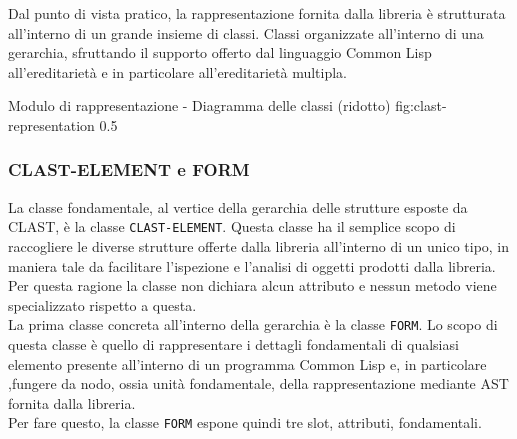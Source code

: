 Dal punto di vista pratico, la rappresentazione fornita dalla libreria è
strutturata all’interno di un grande insieme di classi. Classi organizzate
all’interno di una gerarchia, sfruttando il supporto offerto dal linguaggio
Common Lisp all’ereditarietà e in particolare all’ereditarietà multipla.

      {Modulo di rappresentazione - Diagramma delle classi (ridotto)}
      {fig:clast-representation}
      {0.5}

\subsubsection{CLAST-ELEMENT e FORM}

La classe fondamentale, al vertice della gerarchia delle strutture esposte da
CLAST, è la classe \texttt{CLAST-ELEMENT}. Questa classe ha il semplice scopo
di raccogliere le diverse strutture offerte dalla libreria all'interno di un
unico tipo, in maniera tale da facilitare l’ispezione e l’analisi di oggetti
prodotti dalla libreria. Per questa ragione la classe non dichiara alcun
attributo e nessun metodo viene specializzato rispetto a questa.\\

La prima classe concreta all’interno della gerarchia è la classe \texttt{FORM}.
Lo scopo di questa classe è quello di rappresentare i dettagli fondamentali di
qualsiasi elemento presente all’interno di un programma Common Lisp e, in
particolare ,fungere da nodo, ossia unità fondamentale, della rappresentazione
mediante AST fornita dalla libreria.\\

Per fare questo, la classe \texttt{FORM} espone quindi tre slot, attributi,
fondamentali.

